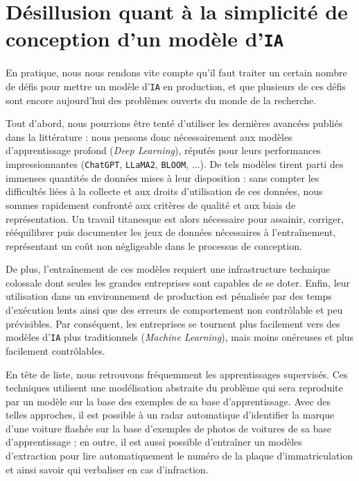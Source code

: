 		
	\section*{Désillusion quant à la simplicité de conception d'un modèle d'\texttt{IA}}
		
		En pratique, nous nous rendons vite compte qu'il faut traiter un certain nombre de défis pour mettre un modèle d'\texttt{IA} en production, et que plusieurs de ces défis sont encore aujourd'hui des problèmes ouverts du monde de la recherche.
		
		Tout d'abord, nous pourrions être tenté d'utiliser les dernières avancées publiés dans la littérature : nous pensons donc nécessairement aux modèles d'apprentissage profond (\textit{Deep Learning}), réputés pour leurs performances impressionnantes (\texttt{ChatGPT}, \texttt{LLaMA2}, \texttt{BLOOM}, ...).
		De tels modèles tirent parti des immenses quantités de données mises à leur disposition : sans compter les difficultés liées à la collecte et aux droits d'utilisation de ces données, nous sommes rapidement confronté aux critères de qualité et aux biais de représentation.
		Un travail titanesque est alors nécessaire pour assainir, corriger, rééquilibrer puis documenter les jeux de données nécessaires à l'entraînement, représentant un coût non négligeable dans le processus de conception.
		
		De plus, l'entraînement de ces modèles requiert une infrastructure technique colossale dont seules les grandes entreprises sont capables de se doter.
		Enfin, leur utilisation dans un environnement de production est pénalisée par des temps d'exécution lents ainsi que des erreurs de comportement non contrôlable et peu prévisibles.
		Par conséquent, les entreprises se tournent plus facilement vers des modèles d'\texttt{IA} plus traditionnels (\textit{Machine Learning}), mais moins onéreuses et plus facilement contrôlables.
		
		En tête de liste, nous retrouvons fréquemment les apprentissages supervisés.
		Ces techniques utilisent une modélisation abstraite du problème qui sera reproduite par un modèle sur la base des exemples de sa base d'apprentissage.
		Avec des telles approches, il est possible à un radar automatique d'identifier la marque d'une voiture flashée sur la base d'exemples de photos de voitures de sa base d'apprentissage ; en outre, il est aussi possible d'entraîner un modèles d'extraction pour lire automatiquement le numéro de la plaque d'immatriculation et ainsi savoir qui verbaliser en cas d'infraction.
		
